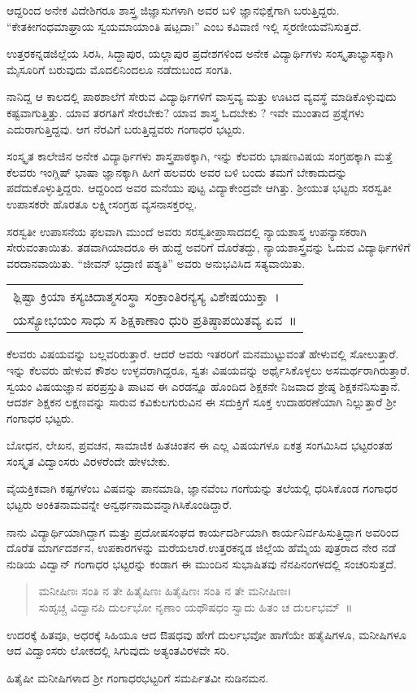 {ಆದ್ದರಿಂದ ಅನೇಕ ವಿದೇಶಿಗರೂ ಶಾಸ್ತ್ರ ಜಿಜ್ಞಾಸುಗಳಾಗಿ ಅವರ ಬಳಿ ಜ್ಞಾನಭಿಕ್ಷೆಗಾಗಿ ಬರುತ್ತಿದ್ದರು. “ಕೇತಕೀಗಂಧಮಾಘ್ರಾಯ ಸ್ವಯಮಾಯಾಂತಿ ಷಟ್ಪದಾಃ” ಎಂಬ ಕವಿವಾಣಿ ಇಲ್ಲಿ ಸ್ಮರಣೀಯವೆನಿಸುತ್ತದೆ.
\vskip 2pt

ಉತ್ತರಕನ್ನಡಜಿಲ್ಲೆಯ ಸಿರಸಿ, ಸಿದ್ದಾಪುರ, ಯಲ್ಲಾಪುರ ಪ್ರದೇಶಗಳಿಂದ ಅನೇಕ ವಿದ್ಯಾರ್ಥಿಗಳು ಸಂಸ್ಕೃತಾಭ್ಯಾಸಕ್ಕಾಗಿ ಮೈಸೂರಿಗೆ ಬರುವುದು ಮೊದಲಿನಿಂದಲೂ ನಡೆದು\-ಬಂದ ಸಂಗತಿ. 
\vskip 2pt

ನಾನಿದ್ದ ಆ ಕಾಲದಲ್ಲಿ ಪಾಠಶಾಲೆಗೆ ಸೇರುವ ವಿದ್ಯಾರ್ಥಿಗಳಿಗೆ ವಾಸ್ತವ್ಯ ಮತ್ತು ಊಟದ ವ್ಯವಸ್ಥೆ ಮಾಡಿಕೊಳ್ಳುವುದು ಕಷ್ಟವಾಗುತ್ತಿತ್ತು. ಯಾವ ತರಗತಿಗೆ ಸೇರಬೇಕು? ಯಾವ ಶಾಸ್ತ್ರ ಓದಬೇಕು ? ಇವೇ ಮುಂತಾದ ಪ್ರಶ್ನೆಗಳು ಎದುರಾಗುತ್ತಿದ್ದವು. ಆಗ ನೆರವಿಗೆ ಬರುತ್ತಿದ್ದವರು ಗಂಗಾಧರ ಭಟ್ಟರು.
\vskip 2pt

ಸಂಸ್ಕೃತ ಕಾಲೇಜಿನ ಅನೇಕ ವಿದ್ಯಾರ್ಥಿಗಳು ಶಾಸ್ತ್ರಪಾಠಕ್ಕಾಗಿ, ಇನ್ನು ಕೆಲವರು ಭಾಷಣವಿಷಯ ಸಂಗ್ರಹಕ್ಕಾಗಿ ಮತ್ತೆ ಕೆಲವರು ಇಂಗ್ಲಿಷ್ ಭಾಷಾ ಜ್ಞಾನಕ್ಕಾಗಿ ಹೀಗೆ ಹಲವರು ಅವರ ಬಳಿ ಬಂದು ತಮಗೆ ಬೇಕಾದುದನ್ನು ಪದೆದುಕೊಳ್ಳುತ್ತಿದ್ದರು. ಆದ್ದರಿಂದ ಅವರ ಮನೆಯು ಪುಟ್ಟ ವಿದ್ಯಾಕೇಂದ್ರವೇ ಆಗಿತ್ತು. ಶ್ರೀಯುತ ಭಟ್ಟರು ಸರಸ್ವತೀ ಉಪಾಸಕರೇ ಹೊರತೂ ಲಕ್ಷ್ಮೀಸಂಗ್ರಹ  \enginline{-}  ವ್ಯಸನಾಸಕ್ತರಲ್ಲ.

ಸರಸ್ವತೀ ಉಪಾಸನೆಯ ಫಲವಾಗಿ ಮುಂದೆ ಅವರು ಸರಸ್ವತೀಪ್ರಾಸಾದದಲ್ಲಿ ನ್ಯಾಯಶಾಸ್ತ್ರ ಉಪನ್ಯಾಸಕರಾಗಿ ಸೇರುವಂತಾಯಿತು. ತಡವಾಗಿಯಾದರೂ ಈ ಹುದ್ದೆ ಅವರಿಗೆ ದೊರೆತದ್ದು, ನ್ಯಾಯಶಾಸ್ತ್ರವನ್ನು ಓದುವ ವಿದ್ಯಾರ್ಥಿಗಳಿಗೆ ವರದಾನವಾಯಿತು. “ಜೀವನ್ ಭದ್ರಾಣಿ ಪಶ್ಯತಿ” ಅವರು ಅನುಭವಿಸಿದ ಸತ್ಯವಾಯಿತು.
\smallskip

\begin{tabular}{>{\hspace{0.8cm}}l}
ಶ್ಲಿಷ್ಟಾ ಕ್ರಿಯಾ ಕಸ್ಯಚಿದಾತ್ಮಸಂಸ್ಥಾ ಸಂಕ್ರಾಂತಿರನ್ಯಸ್ಯ ವಿಶೇಷಯುಕ್ತಾ~।\\
ಯಸ್ಯೋಭಯಂ ಸಾಧು ಸ ಶಿಕ್ಷಕಾಣಾಂ ಧುರಿ ಪ್ರತಿಷ್ಠಾಪಯಿತವ್ಯ ಏವ~॥
\end{tabular}
\smallskip

ಕೆಲವರು ವಿಷಯವನ್ನು ಬಲ್ಲವರಿರುತ್ತಾರೆ. ಆದರೆ ಅವರು ಇತರರಿಗೆ ಮನಮುಟ್ಟುವಂತೆ ಹೇಳುವಲ್ಲಿ ಸೋಲುತ್ತಾರೆ. ಇನ್ನು ಕೆಲವರು ಹೇಳುವ ಕೌಶಲ ಉಳ್ಳವರಾಗಿದ್ದರೂ, ಸ್ವತಃ ವಿಷಯವನ್ನು ಅರ್ಥೈಸಿಕೊಳ್ಳಲು ಅಸಮರ್ಥರಾಗಿರುತ್ತಾರೆ. ಸ್ವಯಂ ವಿಷಯಜ್ಞಾನ   \enginline{-}   ಪರಪ್ರಸ್ತುತಿ ಪಾಟವ ಈ ಎರಡನ್ನೂ ಹೊಂದಿದ ಶಿಕ್ಷಕನೇ ನಿಜವಾದ ಶ್ರೇಷ್ಠ ಶಿಕ್ಷಕನೆನಿಸುತ್ತಾನೆ. ಆದರ್ಶ ಶಿಕ್ಷಕನ ಲಕ್ಷಣವನ್ನು ಸಾರುವ ಕವಿಕುಲಗುರುವಿನ ಈ ಸದುಕ್ತಿಗೆ ಸೂಕ್ತ ಉದಾಹರಣೆಯಾಗಿ ನಿಲ್ಲುತ್ತಾರೆ ಶ್ರೀ ಗಂಗಾಧರ ಭಟ್ಟರು.

ಬೋಧನ, ಲೇಖನ, ಪ್ರವಚನ, ಸಾಮಾಜಿಕ ಹಿತಚಿಂತನ ಈ ಎಲ್ಲ ವಿಷಯಗಳೂ ಏಕತ್ರ ಸಂಗಮಿಸಿದ ಭಟ್ಟರಂತಹ ಸಂಸ್ಕೃತ ವಿದ್ವಾಂಸರು ವಿರಳರೆಂದೇ ಹೇಳಬೇಕು. 

ವೈಯಕ್ತಿಕವಾಗಿ ಕಷ್ಟಗಳೆಂಬ ವಿಷವನ್ನು ಪಾನಮಾಡಿ, ಜ್ಞಾನವೆಂಬ ಗಂಗೆಯನ್ನು ತಲೆಯಲ್ಲಿ ಧರಿಸಿಕೊಂಡ ಗಂಗಾಧರ ಭಟ್ಟರು ಅಂಕಿತನಾಮವನ್ನೇ ಅನ್ವರ್ಥನಾಮವನ್ನಾಗಿಸಿಕೊಂಡಿದ್ದಾರೆ.

ನಾನು ವಿದ್ಯಾರ್ಥಿಯಾಗಿದ್ದಾಗ ಮತ್ತು ಪ್ರದೋಷಸಂಘದ ಕಾರ್ಯದರ್ಶಿಯಾಗಿ ಕಾರ್ಯನಿರ್ವಹಿಸುತ್ತಿದ್ದಾಗ ಅವರಿಂದ ದೊರೆತ ಮಾರ್ಗದರ್ಶನ, ಉಪಕಾರಗಳನ್ನು ಮರೆಯಲಾರೆ.ಉತ್ತರಕನ್ನಡ ಜಿಲ್ಲೆಯ ಹೆಮ್ಮೆಯ ಪುತ್ರರಾದ ನೇರ ನಡೆ ನುಡಿಯ ವಿದ್ವಾನ್ ಗಂಗಾಧರ ಭಟ್ಟರನ್ನು ಕಂಡಾಗ ಈ ಮುಂದಿನ ಸುಭಾಷಿತವು ನೆನಪಿನಂಗಳದಲ್ಲಿ ಸಂಚರಿಸುತ್ತದೆ.
\begin{verse}
ಮನೀಷಿಣಃ ಸಂತಿ ನ ತೇ ಹಿತೈಷಿಣಃ ಹಿತೈಷಿಣಃ ಸಂತಿ ನ ತೇ ಮನೀಷಿಣಃ।\\
ಸುಹೃಚ್ಚ ವಿದ್ವಾನಪಿ ದುರ್ಲಭೋ ನೃಣಾಂ ಯಥೌಷಧಂ ಸ್ವಾದು ಹಿತಂ ಚ ದುರ್ಲಭಮ್~॥
\end{verse}
ಉದರಕ್ಕೆ ಹಿತವೂ, ಅಧರಕ್ಕೆ ಸಿಹಿಯೂ ಆದ ಔಷಧವು ಹೇಗೆ ದುರ್ಲಭವೋ ಹಾಗೆಯೇ ಹತೈಷಿಗಳೂ, ಮನೀಷಿಗಳೂ ಆದ ವಿದ್ವಾಂಸರು ಲೋಕದಲ್ಲಿ ಸಿಗುವುದು ಅತ್ಯಂತ\break ವಿರಳವೇ ಸರಿ. 

ಹಿತೈಷೀ ಮನೀಷಿಗಳಾದ ಶ್ರೀ ಗಂಗಾಧರಭಟ್ಟರಿಗೆ ಸಮರ್ಪಿತವೀ ನುಡಿನಮನ.

\articleend
}
